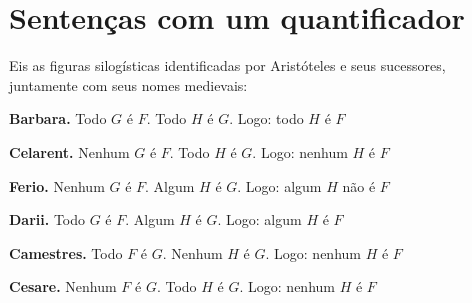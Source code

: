 

\chapter{Sentenças com um quantificador}\label{s:MoreMonadic}\setcounter{ProbPart}{0}
\problempart
\label{pr.BarbaraEtc}
Eis as figuras silogísticas identificadas por Aristóteles e seus sucessores, juntamente com seus nomes medievais:
\begin{compactlist}
\item \textbf{Barbara.} Todo $G$ é $F$. Todo $H$ é $G$. Logo: todo $H$ é $F$
	\item[] 
\item \textbf{Celarent.} Nenhum $G$ é $F$. Todo $H$ é $G$. Logo: nenhum $H$ é $F$
	\item[] 
\item \textbf{Ferio.} Nenhum $G$ é $F$. Algum $H$ é $G$. Logo: algum $H$ não é $F$
	\item[] 
\item \textbf{Darii.} Todo $G$ é $F$. Algum $H$ é $G$. Logo: algum $H$ é $F$
	\item[] 
\item \textbf{Camestres.} Todo $F$ é $G$. Nenhum $H$ é $G$. Logo: nenhum $H$ é $F$
	\item[] 
\item \textbf{Cesare.} Nenhum $F$ é $G$. Todo $H$ é $G$. Logo: nenhum $H$ é $F$

\end{compactlist}
